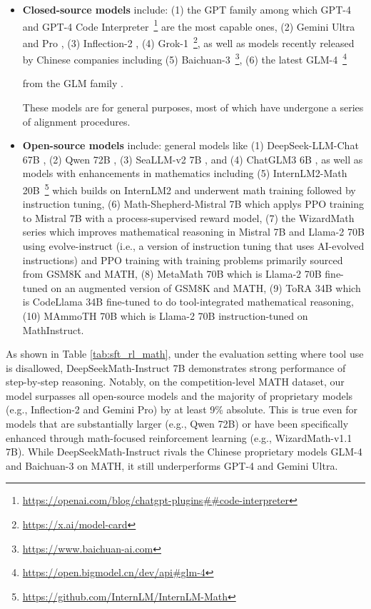 \begin{itemize}[topsep=0pt]
    \item \textbf{Closed-source models} include: (1) the GPT family among which GPT-4 \citep{gpt4} and GPT-4 Code Interpreter~\footnote{\url{https://openai.com/blog/chatgpt-plugins\#\#code-interpreter}} are the most capable ones, (2) Gemini Ultra and Pro \citep{gemini}, (3) Inflection-2 \citep{inflection-2}, (4) Grok-1~\footnote{\url{https://x.ai/model-card}},
    as well as models recently released by Chinese companies including (5) Baichuan-3~\footnote{\url{https://www.baichuan-ai.com}},
    (6) the latest GLM-4~\footnote{\url{https://open.bigmodel.cn/dev/api\#glm-4}}

    from the GLM family \citep{glm}.

    These models are for general purposes, most of which have undergone a series of alignment procedures.
    \item \textbf{Open-source models} include: general models like (1) DeepSeek-LLM-Chat 67B \citep{deepseek-llm}, (2) Qwen 72B \citep{qwen}, (3) SeaLLM-v2 7B \citep{seallm}, and (4) ChatGLM3 6B \citep{chatglm3}, as well as models with enhancements in mathematics including (5) InternLM2-Math 20B~\footnote{\url{https://github.com/InternLM/InternLM-Math}} which builds on InternLM2 and underwent math training followed by instruction tuning, (6) Math-Shepherd-Mistral 7B which applys PPO training \citep{schulman2017proximal} to Mistral 7B \citep{mistral} with a process-supervised reward model, (7) the WizardMath series \citep{wizardmath} which improves mathematical reasoning in Mistral 7B and Llama-2 70B \citep{llama2} using evolve-instruct (i.e., a version of instruction tuning that uses AI-evolved instructions) and PPO training with training problems primarily sourced from GSM8K and MATH, (8) MetaMath 70B \citep{metamath} which is Llama-2 70B fine-tuned on an augmented version of GSM8K and MATH, (9) ToRA 34B \cite{tora} which is CodeLlama 34B fine-tuned to do tool-integrated mathematical reasoning, (10) MAmmoTH 70B \citep{MathInstruct} which is Llama-2 70B instruction-tuned on MathInstruct.
\end{itemize}

As shown in Table \ref{tab:sft_rl_math}, under the evaluation setting where tool use is disallowed, DeepSeekMath-Instruct 7B demonstrates strong performance of step-by-step reasoning. Notably, on the competition-level MATH dataset, our model surpasses all open-source models and the majority of proprietary models (e.g., Inflection-2 and Gemini Pro) by at least 9\% absolute. This is true even for models that are substantially larger (e.g., Qwen 72B) or have been specifically enhanced through math-focused reinforcement learning (e.g., WizardMath-v1.1 7B). While DeepSeekMath-Instruct rivals the Chinese proprietary models GLM-4 and Baichuan-3 on MATH, it still underperforms GPT-4 and Gemini Ultra.

